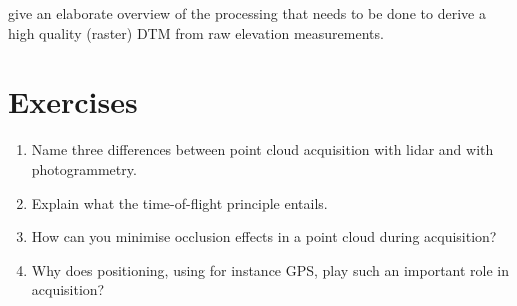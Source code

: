 \citet{Reuter09} give an elaborate overview of the processing that needs to be done to derive a high quality (raster) DTM from raw elevation measurements.


%
\section{Exercises}

\begin{enumerate}
	\item Name three differences between point cloud acquisition with lidar and with photogrammetry.
	\item Explain what the time-of-flight principle entails.
	\item How can you minimise occlusion effects in a point cloud during acquisition?
	\item Why does positioning, using for instance GPS, play such an important role in acquisition?
\end{enumerate}
